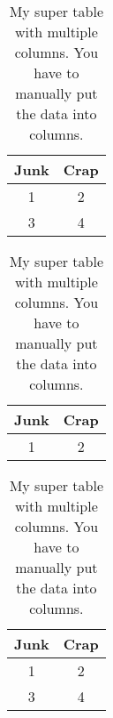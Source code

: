 \documentclass{article}
\begin{document}
\begin{table}[ht]
  \begin{center}

    \begin{tabular}{|c|c|}
      \hline
      Junk & Crap \\
      \hline\hline
      1 & 2\\
      \hline
      3 & 4\\
      \hline
    \end{tabular}
    \quad
    \begin{tabular}{|c|c|}
      \hline
      Junk & Crap \\
      \hline\hline
      1 & 2\\
      \hline
    \end{tabular}
    \quad
    \begin{tabular}{|c|c|}
      \hline
      Junk & Crap \\
      \hline\hline
      1 & 2\\
      \hline
      3 & 4\\
      \hline
    \end{tabular}
    
  \end{center}
  \caption{
    My super table with multiple columns.  You have to manually put
    the data into columns.
  }
\end{table}
\end{document}
